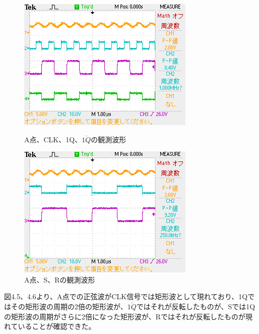 \documentclass{jlreq}
\numberwithin{equation}{section}
\begin{document}
\begin{figure}[H]
  \centering
  \begin{minipage}{0.48\textwidth}
    \centering
    \includegraphics[width=\textwidth]{assets/sg01.png}
    \caption{A点、CLK、1Q、\(\overline{1Q}\)の観測波形}
  \end{minipage}
  \hfill
  \begin{minipage}{0.48\textwidth}
    \centering
    \includegraphics[width=\textwidth]{assets/sg02.png}
    \caption{A点、S、Rの観測波形}
  \end{minipage}
\end{figure}

図4.5、4.6より、A点での正弦波がCLK信号では矩形波として現れており、1Qで
はその矩形波の周期の2倍の矩形波が、\(\overline{1Q}\)ではそれが反転したものが、Sでは1Qの矩形波の周期がさらに2倍になった矩形波が、Rではそれが反転したものが現れていることが確認できた。
\end{document}
